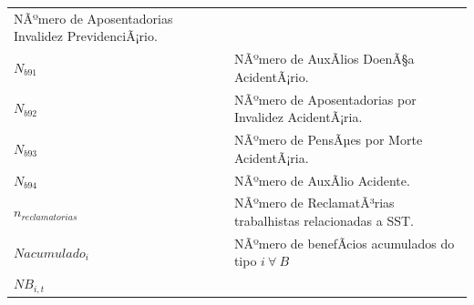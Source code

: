 \documentclass[]{article}
\begin{document}
\begin{longtable}[]{@{}ll@{}}
\begin{minipage}[t]{0.87\columnwidth}
NÃºmero de Aposentadorias Invalidez PrevidenciÃ¡rio.\strut
\end{minipage}\tabularnewline
\begin{minipage}[t]{0.07\columnwidth}\raggedright\strut
\(N_{b91}\)\strut
\end{minipage} & \begin{minipage}[t]{0.87\columnwidth}\raggedright\strut
NÃºmero de AuxÃ­lios DoenÃ§a AcidentÃ¡rio.\strut
\end{minipage}\tabularnewline
\begin{minipage}[t]{0.07\columnwidth}\raggedright\strut
\(N_{b92}\)\strut
\end{minipage} & \begin{minipage}[t]{0.87\columnwidth}\raggedright\strut
NÃºmero de Aposentadorias por Invalidez AcidentÃ¡ria.\strut
\end{minipage}\tabularnewline
\begin{minipage}[t]{0.07\columnwidth}\raggedright\strut
\(N_{b93}\)\strut
\end{minipage} & \begin{minipage}[t]{0.87\columnwidth}\raggedright\strut
NÃºmero de PensÃµes por Morte AcidentÃ¡ria.\strut
\end{minipage}\tabularnewline
\begin{minipage}[t]{0.07\columnwidth}\raggedright\strut
\(N_{b94}\)\strut
\end{minipage} & \begin{minipage}[t]{0.87\columnwidth}\raggedright\strut
NÃºmero de AuxÃ­lio Acidente.\strut
\end{minipage}\tabularnewline
\begin{minipage}[t]{0.07\columnwidth}\raggedright\strut
\(n_{reclamatorias}\)\strut
\end{minipage} & \begin{minipage}[t]{0.87\columnwidth}\raggedright\strut
NÃºmero de ReclamatÃ³rias trabalhistas relacionadas a SST.\strut
\end{minipage}\tabularnewline
\begin{minipage}[t]{0.07\columnwidth}\raggedright\strut
\(Nacumulado_{i}\)\strut
\end{minipage} & \begin{minipage}[t]{0.87\columnwidth}\raggedright\strut
NÃºmero de benefÃ­cios acumulados do tipo \(i\ \forall\ B\)\strut
\end{minipage}\tabularnewline
\begin{minipage}[t]{0.07\columnwidth}\raggedright\strut
\(NB_{i,t}\)\strut

\end{minipage}
\end{longtable}
\end{document}

